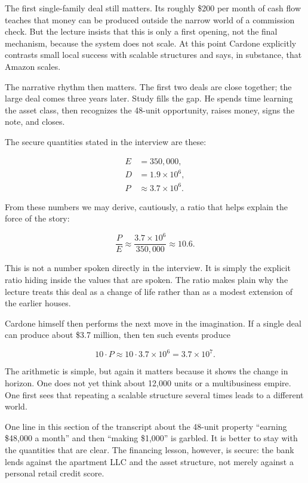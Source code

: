 The first single-family deal still matters. Its roughly \$200 per month of cash flow teaches that money can be produced outside the narrow world of a commission check. But the lecture insists that this is only a first opening, not the final mechanism, because the system does not scale. At this point Cardone explicitly contrasts small local success with scalable structures and says, in substance, that Amazon scales.

The narrative rhythm then matters. The first two deals are close together; the large deal comes three years later. Study fills the gap. He spends time learning the asset class, then recognizes the 48-unit opportunity, raises money, signs the note, and closes.

The secure quantities stated in the interview are these:

\begin{align}
E &= 350{,}000,\\
D &= 1.9\times 10^6,\\
P &\approx 3.7\times 10^6.
\end{align}

From these numbers we may derive, cautiously, a ratio that helps explain the force of the story:

\begin{equation}
\frac{P}{E}\approx \frac{3.7\times 10^6}{350{,}000}\approx 10.6.
\end{equation}

This is not a number spoken directly in the interview. It is simply the explicit ratio hiding inside the values that are spoken. The ratio makes plain why the lecture treats this deal as a change of life rather than as a modest extension of the earlier houses.

Cardone himself then performs the next move in the imagination. If a single deal can produce about \$3.7 million, then ten such events produce

\begin{equation}
10\cdot P \approx 10\cdot 3.7\times 10^6 = 3.7\times 10^7.
\end{equation}

The arithmetic is simple, but again it matters because it shows the change in horizon. One does not yet think about 12,000 units or a multibusiness empire. One first sees that repeating a scalable structure several times leads to a different world.

\begin{remark}
One line in this section of the transcript about the 48-unit property ``earning \$48,000 a month'' and then ``making \$1,000'' is garbled. It is better to stay with the quantities that are clear. The financing lesson, however, is secure: the bank lends against the apartment LLC and the asset structure, not merely against a personal retail credit score.
\end{remark}


